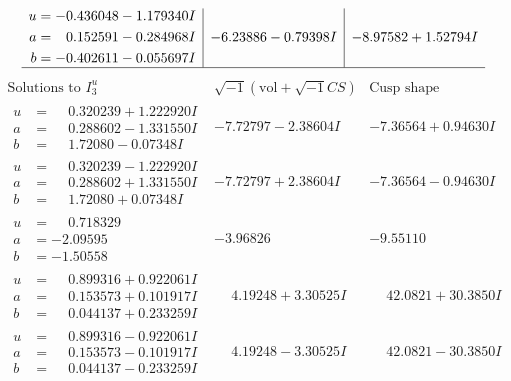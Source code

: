 \documentclass[1p]{elsarticle_modified}
\theoremstyle{definition}
\newcommand{\I}{\sqrt{-1}}
\begin{document}
$$\begin{array}{c|c|c}
\begin{aligned}
u &= -0.436048 - 1.179340 I \\
a &= \phantom{-}0.152591 - 0.284968 I \\
b &= -0.402611 - 0.055697 I\end{aligned}
 & -6.23886 - 0.79398 I & -8.97582 + 1.52794 I\\
 \hline 
 \end{array}$$\newpage$$\begin{array}{c|c|c}  
\text{Solutions to }I^u_{3}& \I (\text{vol} + \sqrt{-1}CS) & \text{Cusp shape}\\
 \hline 
\begin{aligned}
u &= \phantom{-}0.320239 + 1.222920 I \\
a &= \phantom{-}0.288602 - 1.331550 I \\
b &= \phantom{-}1.72080 - 0.07348 I\end{aligned}
 & -7.72797 - 2.38604 I & -7.36564 + 0.94630 I \\ \hline\begin{aligned}
u &= \phantom{-}0.320239 - 1.222920 I \\
a &= \phantom{-}0.288602 + 1.331550 I \\
b &= \phantom{-}1.72080 + 0.07348 I\end{aligned}
 & -7.72797 + 2.38604 I & -7.36564 - 0.94630 I \\ \hline\begin{aligned}
u &= \phantom{-}0.718329\phantom{ +0.000000I} \\
a &= -2.09595\phantom{ +0.000000I} \\
b &= -1.50558\phantom{ +0.000000I}\end{aligned}
 & -3.96826\phantom{ +0.000000I} & -9.55110\phantom{ +0.000000I} \\ \hline\begin{aligned}
u &= \phantom{-}0.899316 + 0.922061 I \\
a &= \phantom{-}0.153573 + 0.101917 I \\
b &= \phantom{-}0.044137 + 0.233259 I\end{aligned}
 & \phantom{-}4.19248 + 3.30525 I & \phantom{-}42.0821 + 30.3850 I \\ \hline\begin{aligned}
u &= \phantom{-}0.899316 - 0.922061 I \\
a &= \phantom{-}0.153573 - 0.101917 I \\
b &= \phantom{-}0.044137 - 0.233259 I\end{aligned}
 & \phantom{-}4.19248 - 3.30525 I & \phantom{-}42.0821 - 30.3850 I \\ \hline\begin{aligned}

\end{aligned}
\end{array}$$
\end{document}
